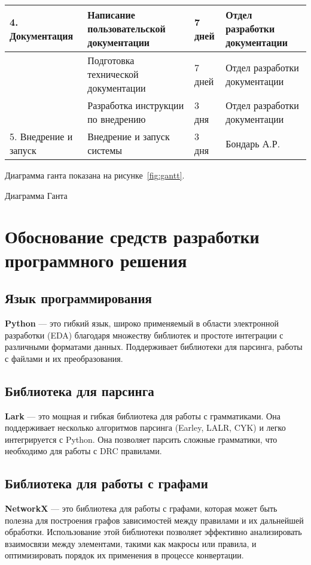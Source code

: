 \begin{longtable}{|p{3.5cm}|p{4cm}|p{3cm}|p{4cm}|}
	4. Документация
	& Написание пользовательской документации
	& 7 дней
	& Отдел разработки документации \\ \hline

	& Подготовка технической документации
	& 7 дней
	& Отдел разработки документации \\ \hline

	& Разработка инструкции по внедрению
	& 3 дня
	& Отдел разработки документации \\ \hline

	5. Внедрение и запуск
	& Внедрение и запуск системы
	& 3 дня
	& Бондарь А.Р. \\ \hline
\end{longtable}

Диаграмма ганта показана на рисунке~\ref{fig:gantt}.

\begin{image}
	\caption{Диаграмма Ганта}
	\label{fig:gantt}
\end{image}

\section{Обоснование средств разработки программного решения}

\subsection{Язык программирования}
\textbf{Python} --- это гибкий язык,
широко применяемый в области электронной разработки (EDA)
благодаря множеству библиотек
и простоте интеграции с различными форматами данных.
Поддерживает библиотеки для парсинга, работы с файлами и их преобразования.
  
\subsection{Библиотека для парсинга}
\textbf{Lark} --- это мощная и гибкая библиотека
для работы с грамматиками.
Она поддерживает несколько алгоритмов парсинга (Earley, LALR, CYK)
и легко интегрируется с Python.
Она позволяет парсить сложные грамматики,
что необходимо для работы с DRC правилами.

\subsection{Библиотека для работы с графами}
\textbf{NetworkX} --- это библиотека для работы с графами,
которая может быть полезна для построения графов зависимостей между правилами
и их дальнейшей обработки.
Использование этой библиотеки позволяет эффективно анализировать взаимосвязи
между элементами, такими как макросы или правила,
и оптимизировать порядок их применения в процессе конвертации.

